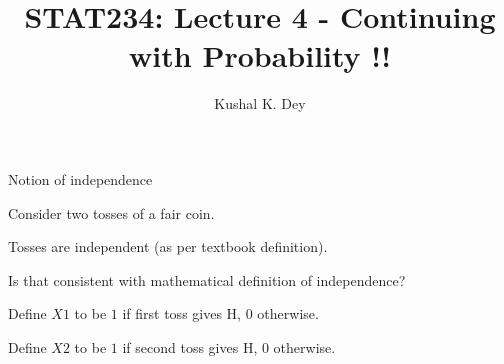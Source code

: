 \documentclass{beamer}\usepackage[]{graphicx}\usepackage[]{color}
\title{STAT234: Lecture 4 - Continuing with Probability !!}
\author{Kushal K. Dey}
\date{}
\begin{document}





\begin{frame}{}
\maketitle
\end{frame}


\begin{frame}[fragile]{Notion of independence \;\;}

Consider two tosses of a fair coin. \pause \newline

Tosses are independent (as per textbook definition). \pause \newline

Is that consistent with mathematical definition of independence?

Define $X1$ to be $1$ if first toss gives H, $0$ otherwise.

Define $X2$ to be $1$ if second toss gives H, $0$ otherwise.

\end{frame}
\end{document}
